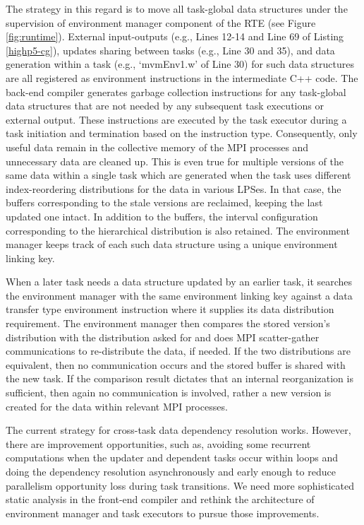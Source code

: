 \documentclass[ASNA,twocolumn]{USG} %
\begin{document}
{The strategy in this regard is to move all task-global data structures under the supervision of environment manager component of the RTE (see Figure \ref{fig:runtime}). External input-outputs (e.g., Lines 12-14 and Line 69 of Listing \ref{highp5-cg}), updates sharing between tasks (e.g., Line 30 and 35), and data generation within a task (e.g., `mvmEnv1.w' of Line 30) for such data structures are all registered as environment instructions in the intermediate C++ code. The back-end compiler generates garbage collection instructions for any task-global data structures that are not needed by any subsequent task executions or external output. These instructions are executed by the task executor during a task initiation and termination based on the instruction type. Consequently, only useful data remain in the collective memory of the MPI processes and unnecessary data are cleaned up. This is even true for multiple versions of the same data within a single task which are generated when the task uses different index-reordering distributions for the data in various LPSes. In that case, the buffers corresponding to the stale versions are reclaimed, keeping the last updated one intact. In addition to the buffers, the interval configuration corresponding to the hierarchical distribution is also retained. The environment manager keeps track of each such data structure using a unique environment linking key.

When a later task needs a data structure updated by an earlier task, it searches the environment manager with the same environment linking key against a data transfer type environment instruction where it supplies its data distribution requirement. The environment manager then compares the stored version's distribution with the distribution asked for and does MPI scatter-gather communications to re-distribute the data, if needed. If the two distributions are equivalent, then no communication occurs and the stored buffer is shared with the new task. If the comparison result dictates that an internal reorganization is sufficient, then again no communication is involved, rather a new version is created for the data within relevant MPI processes.

{\color{red}
The current strategy for cross-task data dependency resolution works. However, there are improvement opportunities, such as, avoiding some recurrent computations when the updater and dependent tasks occur within loops and doing the dependency resolution asynchronously and early enough to reduce parallelism opportunity loss during task transitions. We need more sophisticated static analysis in the front-end compiler and rethink the architecture of environment manager and task executors to pursue those improvements.
}   

}
\end{document}
